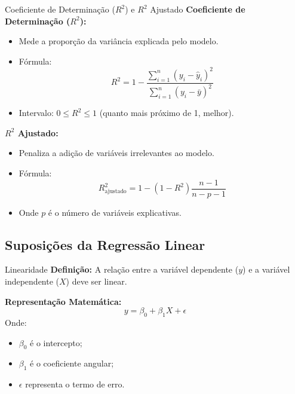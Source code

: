 \documentclass{beamer}
\begin{document}
\begin{frame}{Coeficiente de Determinação ($R^2$) e $R^2$ Ajustado}
    \textbf{Coeficiente de Determinação ($R^2$):}
    \begin{itemize}
        \item Mede a proporção da variância explicada pelo modelo.
        \item Fórmula:
        \begin{equation}
            R^2 = 1 - \frac{\sum_{i=1}^{n} (y_i - \hat{y}_i)^2}{\sum_{i=1}^{n} (y_i - \bar{y})^2}
        \end{equation}
        \item Intervalo: $0 \leq R^2 \leq 1$ (quanto mais próximo de 1, melhor).
    \end{itemize}

    \textbf{$R^2$ Ajustado:}
    \begin{itemize}
        \item Penaliza a adição de variáveis irrelevantes ao modelo.
        \item Fórmula:
        \begin{equation}
            R^2_{\text{ajustado}} = 1 - \left(1 - R^2\right) \frac{n - 1}{n - p - 1}
        \end{equation}
        \item Onde $p$ é o número de variáveis explicativas.
    \end{itemize}
\end{frame}


\subsection{Suposições da Regressão Linear}

\begin{frame}{Linearidade}
    \textbf{Definição:}
    A relação entre a variável dependente ($y$) e a variável independente ($X$) deve ser linear.

    \vspace{0.5cm}
    \textbf{Representação Matemática:}
    \begin{equation}
        y = \beta_0 + \beta_1X + \epsilon
    \end{equation}
    Onde:
    \begin{itemize}
        \item $\beta_0$ é o intercepto;
        \item $\beta_1$ é o coeficiente angular;
        \item $\epsilon$ representa o termo de erro.
    \end{itemize}

    \hspace{3cm}
\end{frame}
\end{document}

